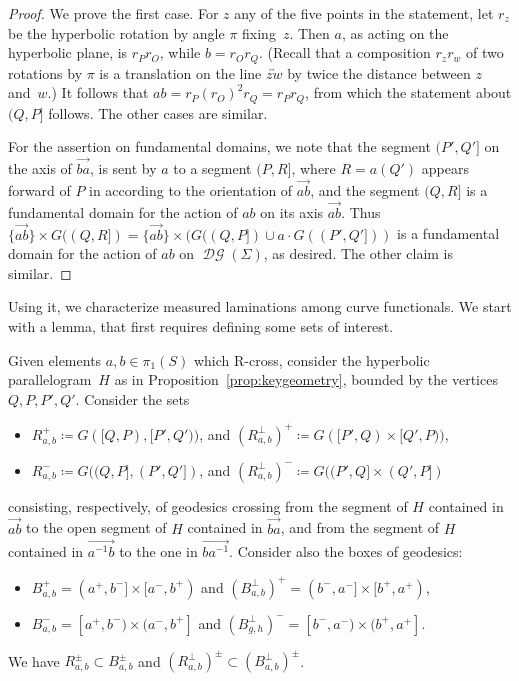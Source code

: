 \documentclass[11pt]{amsart}
\newcommand{\ora}[1]{\overrightarrow{#1}}
\numberwithin{equation}{section}
\numberwithin{figure}{section}
\theoremstyle{definition}
\theoremstyle{plain}
\DeclareMathOperator{\DG}{\mathcal{D}\mathcal{G}}
\begin{document}
\begin{proof}
  We prove the first case.
  For $z$ any of the five points in the statement, let $r_z$ be
  the hyperbolic rotation by angle $\pi$ fixing~$z$. Then $a$, as
  acting on the hyperbolic plane, is $r_P r_O$, while $b = r_O r_Q$.
  (Recall that a composition $r_zr_w$ of two rotations by $\pi$ is a
  translation on the line $\overleftrightarrow{zw}$ by twice the
  distance between $z$ and~$w$.)
  It follows that $ab = r_P (r_O)^2 r_Q =
  r_Pr_Q$, from which the statement about $(Q,P]$
  follows. The other cases are similar.

For the assertion on fundamental domains, we note that the segment
$(P',Q']$ on the axis of $\ora{ba}$, is sent by $a$ to a segment
$(P,R]$, where $R=a(Q')$ appears forward of $P$ in according to the
orientation of $\ora{ab}$, and the segment $(Q,R]$ is a fundamental
domain for the action of $ab$ on its axis $\ora{ab}$. Thus $\{
\ora{ab} \} \times G((Q,R])= \{ \ora{ab} \} \times  (G((Q,P]) \cup a
\cdot G((P',Q']))$ is a fundamental domain for the action of $ab$ on
$\DG(\Sigma)$, as desired.
The other claim is similar.
\end{proof}

Using it, we characterize measured laminations among curve
functionals.
We start with a  lemma, that first requires defining some sets of interest.

Given elements $a, b \in \pi_1(S)$ which R-cross,
consider the hyperbolic parallelogram~$H$ as in Proposition~\ref{prop:keygeometry}, bounded by the vertices $Q,P,P',Q'$.
Consider the sets
\begin{itemize} \item $R_{a,b}^+ \coloneqq G([Q,P), [P', Q'))$, and $(R_{a,b}^{\perp})^+ \coloneqq G([P',Q) \times [Q', P))$, 
\item $R_{a,b}^- \coloneqq G((Q,P], (P', Q'])$, and $(R_{a,b}^{\perp})^- \coloneqq G((P',Q] \times (Q', P])$
\end{itemize}
consisting, respectively, of geodesics crossing from the segment of $H$ contained in $\ora{ab}$ to the open segment of $H$ contained in $\ora{ba}$, and from the segment of $H$ contained in $\ora{a^{-1}b}$ to the one in $\ora{ba^{-1}}$.
Consider also the boxes of geodesics:
\begin{itemize} \item $B_{a,b}^+ = (a^+, b^-] \times [a^-, b^+)$ and  $(B_{a,b}^{\perp})^+ = (b^-, a^-] \times [b^+, a^+)$, 
\item $B_{a,b}^- = [a^+, b^-) \times (a^-, b^+]$ and  $(B_{g,h}^{\perp})^- = [b^-, a^-) \times (b^+, a^+]$.
\end{itemize}
We have $R_{a,b}^{\pm} \subset B_{a,b}^{\pm}$ and $(R_{a,b}^{\perp})^{\pm}  \subset (B_{a,b}^{\perp})^{\pm} $.
\end{document}
